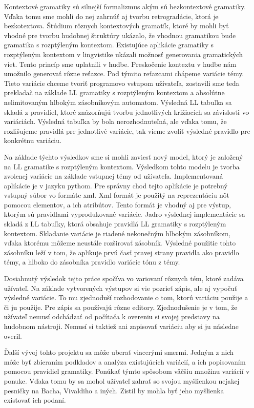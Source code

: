 Kontextové gramatiky sú silnejší formalizmus akým sú bezkontextové gramatiky. Vďaka tomu sme mohli do nej zahrnúť aj tvorbu retrogradácie, ktorá je bezkotextova. Štúdium rôznych kontextových gramatík, ktoré by mohli byť vhodné pre tvorbu hudobnej štruktúry ukázalo, že vhodnou gramatikou bude gramatika s rozptýleným kontextom. Existujúce aplikácie gramatiky s rozptýleným kontextom v lingvistike ukázali možnosť generovania gramatických viet. Tento princíp sme uplatnili v hudbe. Preskočenie kontextu v hudbe nám umožnilo generovať rôzne reťazce. Pod týmito reťazcami chápeme variácie témy. Tieto variácie chceme tvoriť programovo vstupom užívateľa, zostavili sme teda prekladač na základe LL gramatiky s rozptýleným kontextom a absolútne nelimitovaným hlbokým zásobníkovým automatom. Výsledná LL tabuľka sa skladá z pravidiel, ktoré znázorňujú tvorbu jednotlivých križiacich sa závislosti vo variáciách. Výsledná tabuľka by bola nerozhodnuteľná, ale vďaka tomu, že rozlišujeme pravidlá pre jednotlivé variácie, tak vieme zvoliť výsledné pravidlo pre konkrétnu variáciu.

Na základe týchto výsledkov sme si mohli zaviesť nový model, ktorý je založený na LL gramatike s rozptýleným kontextom. Výsledkom tohto modelu je tvorba zvolenej variácie na základe vstupnej témy od užívateľa. Implementovaná aplikácie je v jazyku pythom. Pre správny chod tejto aplikácie je potrebný vstupný súbor vo formáte xml. Xml formát je použitý na reprezentáciu nôt pomocou elementov, a ich atribútov. Tento formát je vhodný aj pre výstup, ktorým sú pravidlami vyprodukované variácie. Jadro výslednej implementácie sa skladá z LL tabuľky, ktorá obsahuje pravidlá LL gramatiky s rozptýleným kontextom. Skladanie variácie je riadené nekonečným hlbokým zásobníkom, vďaka ktorému môžeme neustále rozširovať zásobník. Výsledné použitie tohto zásobníku leží v tom, že aplikuje prvú časť pravej strany pravidla ako pravidlo témy, a hlboko do zásobníka pravidlo variácie tónu z témy.

Dosiahnutý výsledok tejto práce spočíva vo variovaní rôznych tém, ktoré zadáva užívateľ. Na základe vytvorených výstupov si vie pozrieť zápis, ale aj vypočuť výsledné variácie. To mu zjednoduší rozhodovanie o tom, ktorú variáciu použije a či ju použije. Pre zápis sa používajú rôzne editory. Zjednodušenie je v tom, že užívateľ nemusí odchádzať od počítača k overeniu si svojej predstavy na hudobnom nástroji. Nemusí si taktiež ani zapisovať variáciu aby si ju následne overil.

Ďalší vývoj tohto projektu sa môže uberať viacerými smermi. Jedným z nich môže byť zbieraním podkladov a analýza existujúcich variácií, a ich popisovaním pomocou pravidiel gramatiky. Ponúkať týmto spôsobom väčšiu množinu variácií v ponuke. Vďaka tomu by sa mohol užívateľ zahrať so svojou myšlienkou nejakej pesničky na Bacha, Vivaldiho a iných. Zistil by mohla byť jeho myšlienka existovať ich podaní.


